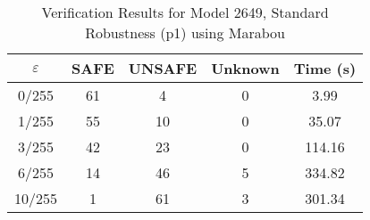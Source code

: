 \begin{table}[htbp]
\centering
\caption{Verification Results for Model 2649, Standard Robustness (p1) using Marabou}
\label{tab:model2649_p1_marabou}
\begin{tabular}{|c|c|c|c|c|}
\hline
$\varepsilon$ & SAFE & UNSAFE & Unknown & Time (s) \\ \hline
0/255 & 61 & 4 & 0 & 3.99 \\ \hline
1/255 & 55 & 10 & 0 & 35.07 \\ \hline
3/255 & 42 & 23 & 0 & 114.16 \\ \hline
6/255 & 14 & 46 & 5 & 334.82 \\ \hline
10/255 & 1 & 61 & 3 & 301.34 \\ \hline
\end{tabular}
\end{table}
